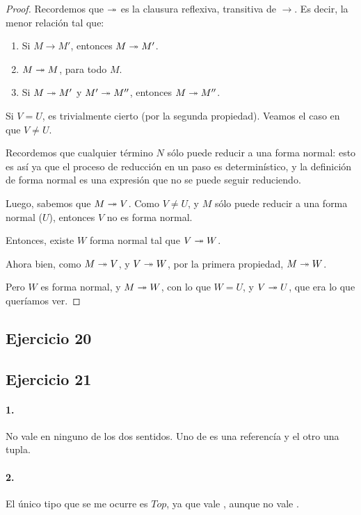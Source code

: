 \begin{proof}
  Recordemos que $\twoheadrightarrow$ es la clausura reflexiva, transitiva de $\to$. Es decir, la menor relación tal que:
  \begin{enumerate}
    \item Si $M\to M'$, entonces $M\twoheadrightarrow M'$.
    \item $M\twoheadrightarrow M$, para todo $M$.
    \item Si $M \twoheadrightarrow M'$ y $M' \twoheadrightarrow M''$, entonces $M \twoheadrightarrow M''$.
  \end{enumerate}

  Si $V = U$, es trivialmente cierto (por la segunda propiedad). Veamos el caso en que $V \neq U$.

  Recordemos que cualquier término $N$ sólo puede reducir a una forma normal: esto es así ya que el proceso de reducción en un paso es determinístico, y la definición de forma normal es una expresión que no se puede seguir reduciendo.

  Luego, sabemos que $M \twoheadrightarrow V$. Como $V \neq U$, y $M$ sólo puede reducir a una forma normal ($U$), entonces $V$ no es forma normal.

  Entonces, existe $W$ forma normal tal que $V \twoheadrightarrow W$.

  Ahora bien, como $M \twoheadrightarrow V$, y $V \twoheadrightarrow W$, por la primera propiedad, $M \twoheadrightarrow W$.

  Pero $W$ es forma normal, y $M \twoheadrightarrow W$, con lo que $W = U$, y $V \twoheadrightarrow U$, que era lo que queríamos ver.
\end{proof}

\subsection*{Ejercicio 20}


\subsection*{Ejercicio 21}

\paragraph{1.} No vale en ninguno de los dos sentidos. Uno de es una referencía y el otro una tupla.

\paragraph{2.} El único tipo que se me ocurre es $Top$, ya que vale , aunque no vale .

